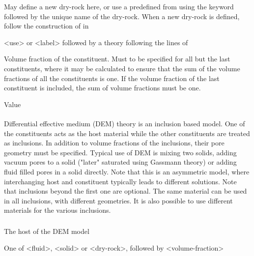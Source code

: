 {
 \slist
   \item \Description  May define a new dry-rock here, or use a predefined  from  using the keyword  followed by the unique name of the dry-rock. When a new dry-rock is defined, follow the construction of  in 
   \item \Argument <use> or <label> followed by a theory following the lines of 
   \item \Default
 \elist

 \slist
   \item \Description Volume fraction of the constituent. Must to be specified for all but the last constituents, where it may be calculated to ensure that the sum of the volume fractions of all the constituents is one. If the volume fraction of the last constituent is included, the sum of volume fractions must be one. 
   \item \Argument Value
   \item \Default
 \elist

\paragraph{}
 \slist
   \item \Description Differential effective medium (DEM) theory is an inclusion based model. One of the constituents acts as the host material while the other constituents are treated as inclusions. In addition to volume fractions of the inclusions, their pore geometry must be specified. Typical use of DEM is mixing two solids, adding vacuum pores to a solid ("later" saturated using Gassmann theory) or adding fluid filled pores in a solid directly. Note that this is an asymmetric model, where interchanging host and constituent typically leads to different solutions. Note that inclusions beyond the first one are optional. The same material can be used in all inclusions, with different geometries. It is also possible to use different materials for the various inclusions.
   \item \Argument
   \item \Default 
 \elist

\subparagraph{}
 \slist
   \item \Description The host of the DEM model
   \item \Argument One of <fluid>, <solid> or <dry-rock>, followed by <volume-fraction>
   \item \Default
 \elist

}

